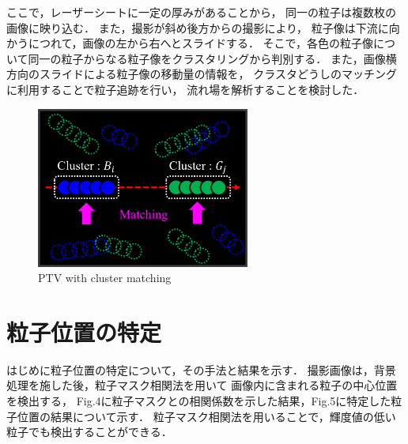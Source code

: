 \documentclass[twocolumn,a4j]{jsarticle}
\begin{document}
ここで，レーザーシートに一定の厚みがあることから，
同一の粒子は複数枚の画像に映り込む．
また，撮影が斜め後方からの撮影により，
粒子像は下流に向かうにつれて，画像の左から右へとスライドする．
そこで，各色の粒子像について同一の粒子からなる粒子像をクラスタリングから判別する．
また，画像横方向のスライドによる粒子像の移動量の情報を，
クラスタどうしのマッチングに利用することで粒子追跡を行い，
流れ場を解析することを検討した．

\begin{figure}[htbp]
	\centering
	\includegraphics[keepaspectratio, width=70mm]{../images/PTV_mthod_with_cluster_matching.png}
	\caption{PTV with cluster matching}
\end{figure}

\section{粒子位置の特定}
はじめに粒子位置の特定について，その手法と結果を示す．
撮影画像は，背景処理を施した後，粒子マスク相関法を用いて
画像内に含まれる粒子の中心位置を検出する，
Fig.4に粒子マスクとの相関係数を示した結果，Fig.5に特定した粒子位置の結果について示す．
粒子マスク相関法を用いることで，輝度値の低い粒子でも検出することができる．
\end{document}
